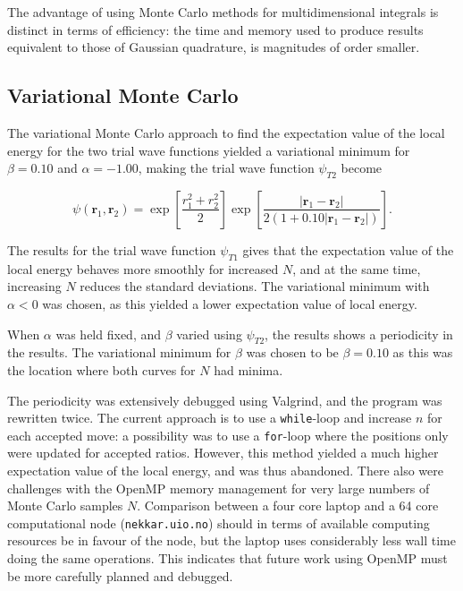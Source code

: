 \documentclass[a4paper,11pt]{article}
\begin{document}
The advantage of using Monte Carlo methods for multidimensional integrals is distinct in terms of efficiency: the time and memory used to produce results equivalent to those of Gaussian quadrature, is magnitudes of order smaller.

\subsection{Variational Monte Carlo}
The variational Monte Carlo approach to find the expectation value of the local energy for the two trial wave functions yielded a variational minimum for $\beta = 0.10$ and $\alpha=-1.00$, making the trial wave function $\psi_{T2}$ become

\begin{equation}
    \psi\left( \mathbf{r}_1, \mathbf{r}_2 \right) = \exp\left[ \frac{r_1^2 + r_2^2}{2} \right] \exp\left[ \frac{|\mathbf{r}_1 - \mathbf{r}_2|}{2 \left( 1 + 0.10 |\mathbf{r}_1 - \mathbf{r}_2| \right)} \right].
    \label{eq:final}
\end{equation}

The results for the trial wave function $\psi_{T1}$ gives that the expectation value of the local energy behaves more smoothly for increased $N$, and at the same time, increasing $N$ reduces the standard deviations. The variational minimum with $\alpha < 0$ was chosen, as this yielded a lower expectation value of local energy.

When $\alpha$ was held fixed, and $\beta$ varied using $\psi_{T2}$, the results shows a periodicity in the results. The variational minimum for $\beta$ was chosen to be $\beta = 0.10$ as this was the location where both curves for $N$ had minima. 

The periodicity was extensively debugged using Valgrind, and the program was rewritten twice. The current approach is to use a \texttt{while}-loop and increase $n$ for each accepted move: a possibility was to use a \texttt{for}-loop where the positions only were updated for accepted ratios. However, this method yielded a much higher expectation value of the local energy, and was thus abandoned. There also were challenges with the OpenMP memory management for very large numbers of Monte Carlo samples $N$. Comparison between a four core laptop and a 64 core computational node (\texttt{nekkar.uio.no}) should in terms of available computing resources be in favour of the node, but the laptop uses considerably less wall time doing the same operations. This indicates that future work using OpenMP must be more carefully planned and debugged. 
\end{document}
